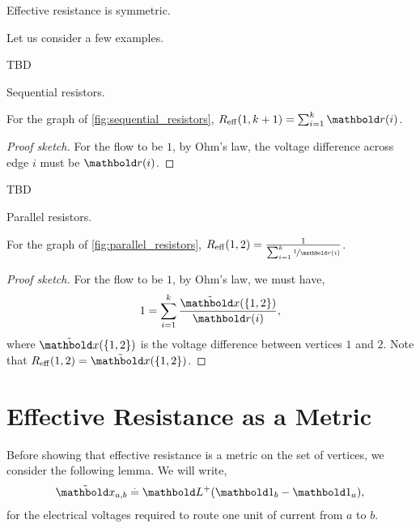 \begin{cor}\label{cor:effective_resistance_symmetric}
Effective resistance is symmetric.
\end{cor}

Let us consider a few examples.

\begin{marginfigure}
TBD
\caption{Sequential resistors.}\label{fig:sequential_resistors}
\end{marginfigure}
\begin{lem}
For the graph of \cref{fig:sequential_resistors}, $\Reff(1,k+1) = \sum_{i=1}^k \vr(i)$.
\end{lem}
\begin{proof}[Proof sketch] For the flow to be $1$, by Ohm's law, the voltage difference across edge $i$ must be $\vr(i)$.
\end{proof}

\begin{marginfigure}
TBD
\caption{Parallel resistors.}\label{fig:parallel_resistors}
\end{marginfigure}
\begin{lem}
For the graph of \cref{fig:parallel_resistors}, $\Reff(1,2) = \frac{1}{\sum_{i=1}^k \nicefrac{1}{\vr(i)}}$.
\end{lem}
\begin{proof}[Proof sketch] For the flow to be $1$, by Ohm's law, we must have, \begin{align*}
    1 = \sum_{i=1}^k \frac{\ex(\{1,2\})}{\vr(i)},
\end{align*} where $\ex(\{1,2\})$ is the voltage difference between vertices $1$ and $2$. Note that $\Reff(1,2) = \ex(\{1,2\})$.
\end{proof}

\section{Effective Resistance as a Metric}

Before showing that effective resistance is a metric on the set of vertices, we consider the following lemma. We will write, \begin{align}
    \ex_{a,b} \defeq \pinv{\mL}(\vOne_b - \vOne_a),
\end{align} for the electrical voltages required to route one unit of current from $a$ to $b$.

